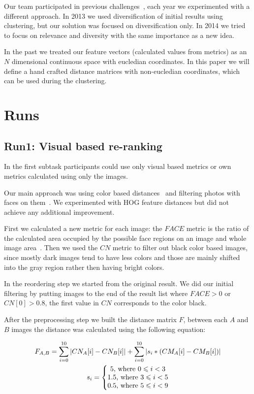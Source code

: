 \documentclass{acm_proc_article-me}
\begin{document}
Our team participated in previous challenges~\cite{szHucs2013bmemtm,Paroczi2014}, each year we experimented with a different approach. In 2013 we used diversification of initial results using clustering, but our solution was focused on diversification only. In 2014 we tried to focus on relevance and diversity with the same importance as a new idea.

In the past we treated our feature vectors (calculated values from metrics) as an $N$ dimensional continuous space with eucledian coordinates. In this paper we will define a hand crafted distance matrices with non-eucledian coordinates, which can be used during the clustering. 

\section{Runs}

\subsection{Run1: Visual based re-ranking}
In the first subtask participants could use only visual based metrics or own metrics calculated using only the images.

Our main approach was using color based distances~\cite{Datta2008,Paramita2010} and filtering photos with faces on them~\cite{szHucs2013bmemtm,Paroczi2014}. We experimented with HOG feature distances but did not achieve any additional improvement.

First we calculated a new metric for each image: the $FACE$ metric is the ratio of the calculated area occupied by the possible face regions on an image and whole
image area~\cite{szHucs2013bmemtm}. Then we used the $CN$ metric to filter out black color based images, since mostly dark images tend to have less colors and those are mainly shifted into the gray region rather then having bright colors.

In the reordering step we started from the original result. We did our initial filtering by putting images to the end of the result list where $FACE>0$ or $CN[0]>0.8$, the first value in $CN$ corresponds to the color black.

After the preprocessing step we built the distance matrix $F$, between each $A$ and $B$ images the distance was calculated using the following equation:

\begin{gather*} 
F_{A,B} = \sum_{i=0}^{10}  \left | CN_{A}[i]-CN_{B}[i] \right | +\sum_{i=0}^{10} \left | s_i * (CM_{A}[i]-CM_{B}[i]) \right |\\
s_i = \left\{\begin{matrix}
5 \textup{, where }0 \leqslant  i < 3\\ 
1.5 \textup{, where }3 \leqslant  i < 5\\ 
0.5 \textup{, where }5 \leqslant  i < 9
\end{matrix}\right.
\end{gather*}
\end{document}
